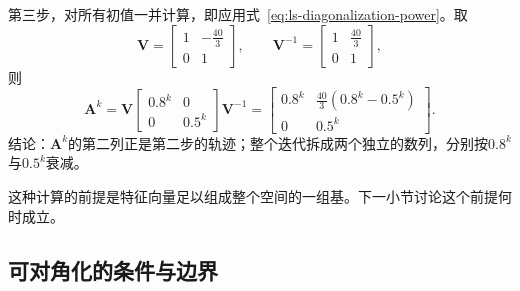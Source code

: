 \begin{example}[用特征向量计算矩阵幂]
第三步，对所有初值一并计算，即应用式~\eqref{eq:ls-diagonalization-power}。取
\[
 \bm V=\begin{bmatrix}1&-\tfrac{40}{3}\\0&1\end{bmatrix},\qquad
 \bm V^{-1}=\begin{bmatrix}1&\tfrac{40}{3}\\0&1\end{bmatrix},
\]
则
\[
 \bm A^k=\bm V\begin{bmatrix}0.8^k&0\\0&0.5^k\end{bmatrix}\bm V^{-1}
 =\begin{bmatrix}0.8^k&\tfrac{40}{3}(0.8^k-0.5^k)\\0&0.5^k\end{bmatrix}.
\]
结论：$\bm A^k$的第二列正是第二步的轨迹；整个迭代拆成两个独立的数列，分别按$0.8^k$与$0.5^k$衰减。
\end{example}
这种计算的前提是特征向量足以组成整个空间的一组基。下一小节讨论这个前提何时成立。

\subsection{可对角化的条件与边界}

